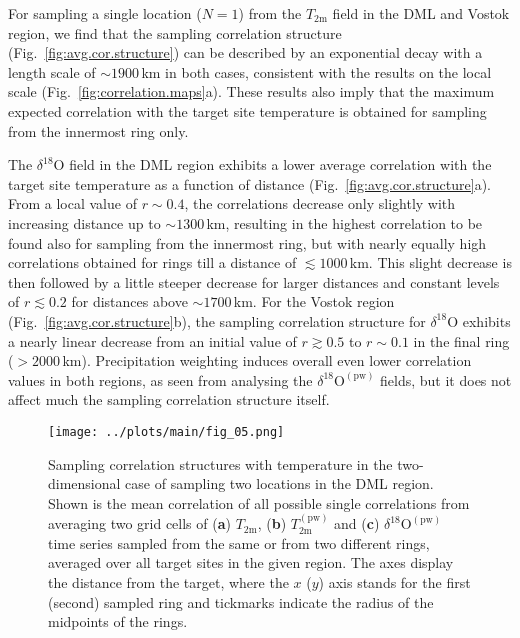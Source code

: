 \documentclass[cp, manuscript, draft]{copernicus}
\begin{document}
For sampling a single location ($N=1$) from the $T_{\mathrm{2m}}$ field in the
DML and Vostok region, we find that the sampling correlation structure
(Fig.~\ref{fig:avg.cor.structure}) can be described by an exponential decay with
a length scale of $\sim1900$\,km in both cases, consistent with the results on
the local scale (Fig.~\ref{fig:correlation.maps}a). These results also imply
that the maximum expected correlation with the target site temperature
is obtained for sampling from the innermost ring only.

The $\delta^{18}\mathrm{O}$ field in the DML region exhibits a lower average
correlation with the target site temperature as a function of distance
(Fig.~\ref{fig:avg.cor.structure}a). From a local value of $r\sim0.4$, the
correlations decrease only slightly with increasing distance up to
$\sim1300$\,km, resulting in the highest correlation to be found also for
sampling from the innermost ring, but with nearly equally high correlations
obtained for rings till a distance of $\lesssim1000$\,km. This slight decrease
is then followed by a little steeper decrease for larger distances and constant
levels of $r\lesssim0.2$ for distances above $\sim1700$\,km. For the Vostok
region (Fig.~\ref{fig:avg.cor.structure}b), the sampling correlation structure
for $\delta^{18}\mathrm{O}$ exhibits a nearly linear decrease from an initial
value of $r\gtrsim0.5$ to $r\sim0.1$ in the final ring ($>2000$\,km).
Precipitation weighting induces overall even lower correlation values in both
regions, as seen from analysing the $\delta^{18}\mathrm{O}^{\mathrm{(pw)}}$
fields, but it does not affect much the sampling correlation structure itself.

\begin{figure*}[t]%
\centering
\texttt{[image: ../plots/main/fig\_05.png]}
\caption{%
  Sampling correlation structures with temperature in the two-dimensional case
  of sampling two locations in the DML region. Shown is the mean correlation of
  all possible single correlations from averaging two grid cells of (\textbf{a})
  $T_{\mathrm{2m}}$, (\textbf{b}) $T_{\mathrm{2m}}^{\mathrm{(pw)}}$ and
  (\textbf{c}) $\delta^{18}\mathrm{O}^{\mathrm{(pw)}}$ time series sampled from
  the same or from two different rings, averaged over all target sites in the
  given region. The axes display the distance from the target, where the $x$
  ($y$) axis stands for the first (second) sampled ring and tickmarks indicate
  the radius of the midpoints of the rings.}
\label{fig:two-core-correlation}%
\end{figure*}%
\end{document}
